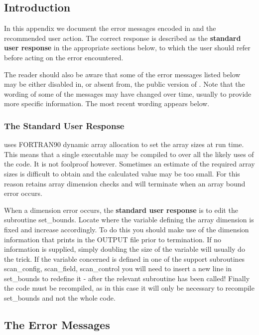 \label{error-messages}
\subsection*{Introduction}
In this appendix we document the error messages encoded in \D and the recommended user action.  The
correct response is described as the {\bf standard user response}
in the appropriate sections below, to which the user should refer
before acting on the error encountered.

The reader should also be aware that some of the error messages
listed below may be either disabled in, or absent from, the public
version of \D.  Note that the wording of some of the messages may
have changed over time, usually to provide more specific
information.  The most recent wording appears below.

\subsubsection*{The Standard User Response}

\D uses FORTRAN90 dynamic array allocation to set the array sizes
at run time.  This means that a single executable may be compiled
to over all the likely uses of the code.  It is not foolproof
however.  Sometimes an estimate of the required array sizes is
difficult to obtain and the calculated value may be too small.
For this reason \D retains array dimension checks and will
terminate when an array bound error occurs.

When a dimension error occurs, the {\bf standard user response} is
to edit the \D \\ subroutine {\sc set\_bounds}.  Locate where the
variable defining the array dimension is fixed and increase
accordingly.  To do this you should make use of the dimension
information that \D prints in the OUTPUT file prior to
termination.  If no information is supplied, simply doubling the
size of the variable will usually do the trick.  If the variable
concerned is defined in one of the support subroutines {\sc
scan\_config, scan\_field, scan\_control} you will need to insert
a new line in {\sc set\_bounds} to redefine it - after the
relevant subroutine has been called!  Finally the code must be
recompiled, as in this case it will only be necessary to recompile
{\sc set\_bounds} and not the whole code.

\subsection*{The \D Error Messages}

